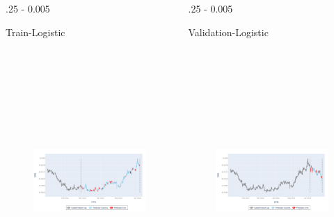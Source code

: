 \documentclass{postertheme}\usepackage[]{graphicx}\usepackage[]{color}
\begin{document}
\begin{frame}
\begin{columns}[onlytextwidth]
  
  \begin{column}{.25 \textwidth - 0.005 \textwidth}
    \begin{block}{Train-Logistic}
        
      \begin{figure}
        \includegraphics[width=18cm, height=10cm, keepaspectratio=true]{figures/plot-class-train-log.png}
      \end{figure}
        
    \end{block}
  \end{column}
  
  \begin{column}{.25 \textwidth - 0.005 \textwidth}
    \begin{block}{Validation-Logistic}
        
      \begin{figure}
        \includegraphics[width=18cm, height=10cm, keepaspectratio=true]{figures/plot-class-val-log.png}
      \end{figure}
        

\end{block}
\end{column}
\end{columns}
\end{frame}
\end{document}
